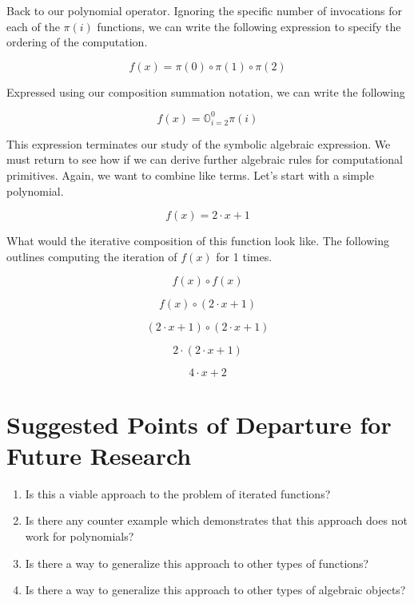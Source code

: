 Back to our polynomial operator. Ignoring the specific number of invocations
for each of the $\pi(i)$ functions, we can write the following expression to
specify the ordering of the computation.

\begin{equation}
    f(x) = \pi(0) \circ \pi(1) \circ \pi(2)
\end{equation}

Expressed using our composition summation notation, we can write the following

\begin{equation}
    f(x) = \mathbb{O}_{i=2}^{0} \pi(i)
\end{equation}

This expression terminates our study of the symbolic algebraic expression. We
must return to see how if we can derive further algebraic rules for
computational primitives. Again, we want to combine like terms. Let's start
with a simple polynomial.

\begin{equation}
    f(x) = 2 \cdot x + 1
\end{equation}

What would the iterative composition of this function look like. The following
outlines computing the iteration of $f(x)$ for 1 times.

\begin{equation}
    f(x) \circ f(x)
\end{equation}

\begin{equation}
    f(x) \circ (2 \cdot x + 1)
\end{equation}

\begin{equation}
    (2 \cdot x + 1) \circ (2 \cdot x + 1)
\end{equation}

\begin{equation}
    2 \cdot (2 \cdot x + 1)
\end{equation}

\begin{equation}
    4 \cdot x + 2
\end{equation}

\section{Suggested Points of Departure for Future Research}
\begin{enumerate}
    \item Is this a viable approach to the problem of iterated functions?
    \item Is there any counter example which demonstrates that this approach does not
          work for polynomials?
    \item Is there a way to generalize this approach to other types of functions?
    \item Is there a way to generalize this approach to other types of algebraic objects?
\end{enumerate}